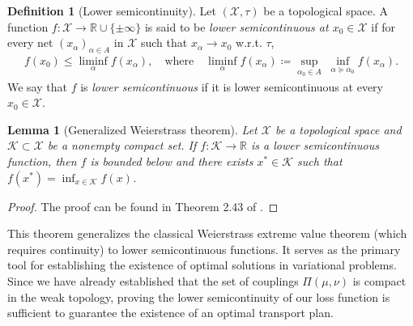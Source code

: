 \documentclass{article}
\theoremstyle{plain}
\newtheorem{lemma}[theorem]{Lemma}
\theoremstyle{definition}
\newtheorem{definition}[theorem]{Definition}
\theoremstyle{remark}
\begin{document}
\begin{definition}[Lower semicontinuity]
	Let $(\mathcal{X},\tau)$ be a topological space. A function $f:\mathcal{X} \to \mathbb{R}\cup\{\pm\infty\}$ is said to be \emph{lower semicontinuous at $x_0\in\mathcal{X}$} if for every net $(x_\alpha)_{\alpha\in A}$ in $\mathcal{X}$ such that $x_\alpha\to x_0$ w.r.t. $\tau$,
	\begin{align*}
		f(x_0)\leq \liminf_{\alpha} f(x_\alpha), \quad\text{where}\quad \liminf_{\alpha} f(x_\alpha)\coloneqq \sup_{\alpha_0\in A}\;\inf_{\alpha\succeq \alpha_0} f(x_\alpha) .
	\end{align*}
	We say that $f$ is \emph{lower semicontinuous} if it is lower semicontinuous at every $x_0\in\mathcal{X}$.
\end{definition}

\begin{lemma}[Generalized Weierstrass theorem]
	\label{lem:extreme-value-theorem}
	Let $\mathcal{X}$ be a topological space and $\mathcal{K} \subset \mathcal{X}$ be a nonempty compact set. If $f: \mathcal{K} \to \mathbb{R}$ is a lower semicontinuous function, then $f$ is bounded below and there exists $x^* \in \mathcal{K}$ such that $f(x^*) = \inf_{x \in \mathcal{K}} f(x)$. 
\end{lemma}
\begin{proof}
	The proof can be found in Theorem 2.43 of \citet{aliprantis2006infinite}.
\end{proof}

This theorem generalizes the classical Weierstrass extreme value theorem (which requires continuity) to lower semicontinuous functions. It serves as the primary tool for establishing the existence of optimal solutions in variational problems. Since we have already established that the set of couplings $\Pi(\mu, \nu)$ is compact in the weak topology, proving the lower semicontinuity of our loss function is sufficient to guarantee the existence of an optimal transport plan.
\end{document}
